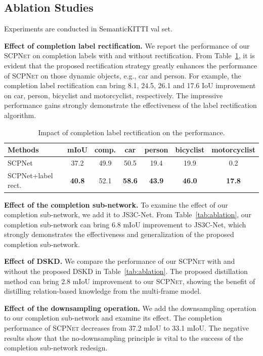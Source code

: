 \documentclass[10pt,twocolumn,letterpaper]{article}
\newcommand{\methodname}{\textsc{SCPNet}}
\begin{document}
\subsection{Ablation Studies}

Experiments are conducted in SemanticKITTI val set.

\textbf{Effect of completion label rectification.}
We report the performance of our \methodname{} on completion labels with and without rectification. From Table~\ref{tab:rectification}, it is evident that the proposed rectification strategy greatly enhances the performance of \methodname{} on those dynamic objects, e.g., car and person. For example, the completion label rectification can bring 8.1, 24.5, 26.1 and 17.6 IoU improvement on car, person, bicyclist and motorcyclist, respectively. The impressive performance gains strongly demonstrate the effectiveness of the label rectification algorithm.

\begin{table}[htbp]
\centering
\caption{Impact of completion label rectification on the performance.}
\label{tab:rectification}
\small
\begin{tabular}{lcccccc}
\toprule
Methods & mIoU & comp. & car & person & bicyclist & motorcyclist \\
\midrule
SCPNet                   & 37.2 & 49.9 & 50.5 & 19.4 & 19.9 & 0.2 \\
SCPNet+label rect.       & \textbf{40.8} & 52.1 & \textbf{58.6} & \textbf{43.9} & \textbf{46.0} & \textbf{17.8} \\
\bottomrule
\end{tabular}
\end{table}

\textbf{Effect of the completion sub-network.}
To examine the effect of our completion sub-network, we add it to JS3C-Net. From Table~\ref{tab:ablation}, our completion sub-network can bring 6.8 mIoU improvement to JS3C-Net, which strongly demonstrates the effectiveness and generalization of the proposed completion sub-network.

\textbf{Effect of DSKD.}
We compare the performance of our \methodname{} with and without the proposed DSKD in Table~\ref{tab:ablation}. The proposed distillation method can bring 2.8 mIoU improvement to our \methodname{}, showing the benefit of distilling relation-based knowledge from the multi-frame model.

\textbf{Effect of the downsampling operation.}
We add the downsampling operation to our completion sub-network and examine its effect. The completion performance of \methodname{} decreases from 37.2 mIoU to 33.1 mIoU. The negative results show that the no-downsampling principle is vital to the success of the completion sub-network redesign.
\end{document}
